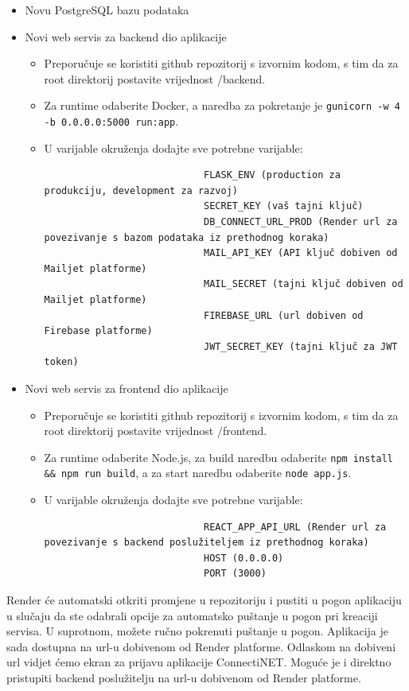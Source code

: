 			\begin{itemize}
					\item Novu PostgreSQL bazu podataka
					\item Novi web servis za backend dio aplikacije
					\begin{itemize}
							\item Preporučuje se koristiti github repozitorij s izvornim kodom, s tim da za root direktorij postavite vrijednost /backend.
							\item Za runtime odaberite Docker, a naredba za pokretanje je \texttt{gunicorn -w 4 -b 0.0.0.0:5000 run:app}.
							\item U varijable okruženja dodajte sve potrebne varijable:
							\begin{verbatim}
							FLASK_ENV (production za produkciju, development za razvoj)
							SECRET_KEY (vaš tajni ključ)
							DB_CONNECT_URL_PROD (Render url za povezivanje s bazom podataka iz prethodnog koraka)
							MAIL_API_KEY (API ključ dobiven od Mailjet platforme)
							MAIL_SECRET (tajni ključ dobiven od Mailjet platforme)
							FIREBASE_URL (url dobiven od Firebase platforme)
							JWT_SECRET_KEY (tajni ključ za JWT token)
							\end{verbatim}
					\end{itemize}
					\item Novi web servis za frontend dio aplikacije
					\begin{itemize}
							\item Preporučuje se koristiti github repozitorij s izvornim kodom, s tim da za root direktorij postavite vrijednost /frontend.
							\item Za runtime odaberite Node.js, za build naredbu odaberite \texttt{npm install && npm run build}, a za start naredbu odaberite \texttt{node app.js}.
							\item U varijable okruženja dodajte sve potrebne varijable:
							\begin{verbatim}
							REACT_APP_API_URL (Render url za povezivanje s backend poslužiteljem iz prethodnog koraka)
							HOST (0.0.0.0)
							PORT (3000)
							\end{verbatim}
					\end{itemize}
			\end{itemize}
			
			Render će automatski otkriti promjene u repozitoriju i pustiti u pogon aplikaciju u slučaju da ste odabrali opcije za automatsko puštanje u pogon pri kreaciji servisa. U suprotnom, možete ručno pokrenuti puštanje u pogon. Aplikacija je sada dostupna na url-u dobivenom od Render platforme. Odlaskom na dobiveni url vidjet ćemo ekran za prijavu aplikacije ConnectiNET. Moguće je i direktno pristupiti backend poslužitelju na url-u dobivenom od Render platforme.
			\eject 